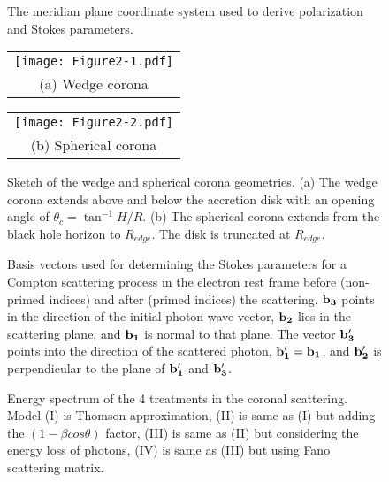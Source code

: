 \documentclass[manuscript]{aastex}
\begin{document}
\clearpage


\begin{figure}
\caption{The meridian plane coordinate system used to derive polarization and Stokes parameters.}
\label{cor2}
\end{figure}

\begin{figure}
  \centering
  \begin{tabular}{@{}c@{}}
    \texttt{[image: Figure2-1.pdf]} \\[\abovecaptionskip]
    \small (a) Wedge corona
  \end{tabular}

  \vspace{\floatsep}

  \begin{tabular}{@{}c@{}}
    \texttt{[image: Figure2-2.pdf]} \\[\abovecaptionskip]
    \small (b) Spherical corona 
  \end{tabular}

  \caption{Sketch of the wedge and spherical corona geometries. (a) The wedge corona extends above and below the accretion disk with an opening angle of $\theta_c=\tan^{-1}H/R$. (b) The spherical corona extends from the black hole horizon to $R_{edge}$. The disk is truncated at $R_{edge}$.}\label{fig:tot}
\end{figure}


\begin{figure}
\caption{Basis vectors used for determining the Stokes parameters for a Compton scattering process in the 
electron rest frame before (non-primed indices) and after (primed indices) the scattering. 
$\bold{b_3}$ points in the direction of the initial photon wave vector, $\bold{b_2}$ lies in the scattering plane, and $\bold{b_1}$ is normal to that plane. The vector $\bold{b'_3}$ points into the direction of the scattered photon, 
$\bold{b'_1} = \bold{b_1}$, and $\bold{b'_2}$ is perpendicular to the plane of $\bold{b'_1}$ and $\bold{b'_3}$.}
\label{cor}
\end{figure}

\begin{figure}
\caption{Energy spectrum of the 4 treatments in the coronal scattering. Model (I) is Thomson approximation, (II) is same as (I) but adding the $(1-\beta cos\theta)$ factor, (III) is same as (II) but considering the energy loss of photons, (IV) is same as (III) but using Fano scattering matrix. }
\label{allflux}
\end{figure}
\end{document}
